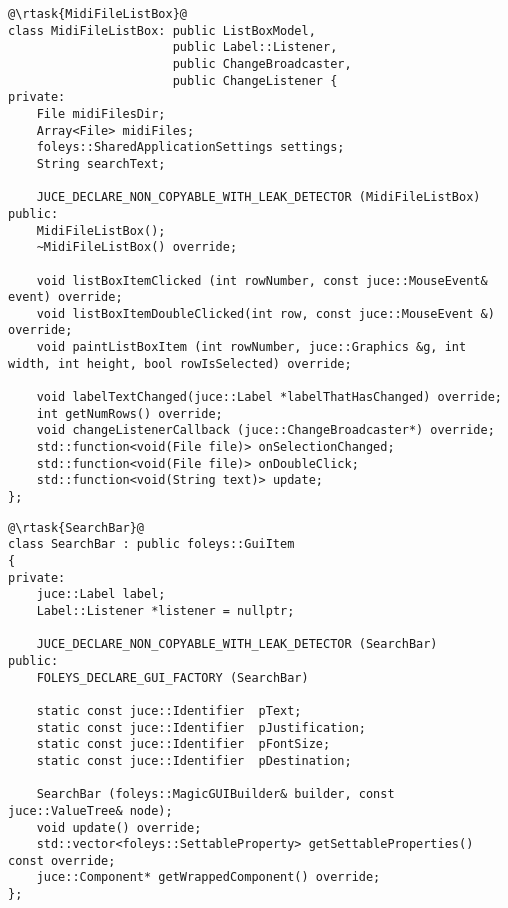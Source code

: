 \begin{verbatim}
@\rtask{MidiFileListBox}@
class MidiFileListBox: public ListBoxModel,
                       public Label::Listener,
                       public ChangeBroadcaster,
                       public ChangeListener {
private:
    File midiFilesDir;
    Array<File> midiFiles;
    foleys::SharedApplicationSettings settings;
    String searchText;

    JUCE_DECLARE_NON_COPYABLE_WITH_LEAK_DETECTOR (MidiFileListBox)
public:
    MidiFileListBox();
    ~MidiFileListBox() override;

    void listBoxItemClicked (int rowNumber, const juce::MouseEvent& event) override;
    void listBoxItemDoubleClicked(int row, const juce::MouseEvent &) override;
    void paintListBoxItem (int rowNumber, juce::Graphics &g, int width, int height, bool rowIsSelected) override;

    void labelTextChanged(juce::Label *labelThatHasChanged) override;
    int getNumRows() override;
    void changeListenerCallback (juce::ChangeBroadcaster*) override;
    std::function<void(File file)> onSelectionChanged;
    std::function<void(File file)> onDoubleClick;
    std::function<void(String text)> update;
};

\end{verbatim}


\begin{verbatim}
@\rtask{SearchBar}@
class SearchBar : public foleys::GuiItem
{
private:
    juce::Label label;
    Label::Listener *listener = nullptr;

    JUCE_DECLARE_NON_COPYABLE_WITH_LEAK_DETECTOR (SearchBar)
public:
    FOLEYS_DECLARE_GUI_FACTORY (SearchBar)

    static const juce::Identifier  pText;
    static const juce::Identifier  pJustification;
    static const juce::Identifier  pFontSize;
    static const juce::Identifier  pDestination;

    SearchBar (foleys::MagicGUIBuilder& builder, const juce::ValueTree& node);
    void update() override;
    std::vector<foleys::SettableProperty> getSettableProperties() const override;
    juce::Component* getWrappedComponent() override;
};
\end{verbatim}

